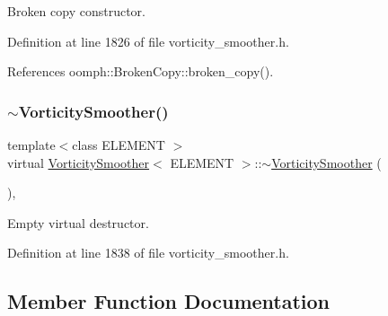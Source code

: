 Broken copy constructor. 



Definition at line 1826 of file vorticity\+\_\+smoother.\+h.



References oomph\+::\+Broken\+Copy\+::broken\+\_\+copy().

\mbox{\label{classVorticitySmoother_a49c513e8cd1c712fb0192ab7a0ddc9eb}} 
\subsubsection{\texorpdfstring{$\sim$\+Vorticity\+Smoother()}{~VorticitySmoother()}}
{\footnotesize\ttfamily template$<$class E\+L\+E\+M\+E\+NT $>$ \\
virtual \hyperlink{classVorticitySmoother}{Vorticity\+Smoother}$<$ E\+L\+E\+M\+E\+NT $>$\+::$\sim$\hyperlink{classVorticitySmoother}{Vorticity\+Smoother} (\begin{DoxyParamCaption}{ }\end{DoxyParamCaption})\hspace{0.3cm}{\ttfamily [inline]}, {\ttfamily [virtual]}}



Empty virtual destructor. 



Definition at line 1838 of file vorticity\+\_\+smoother.\+h.



\subsection{Member Function Documentation}
\mbox{\label{classVorticitySmoother_a8addba8cf70bba3d307c699af0e65506}} 
